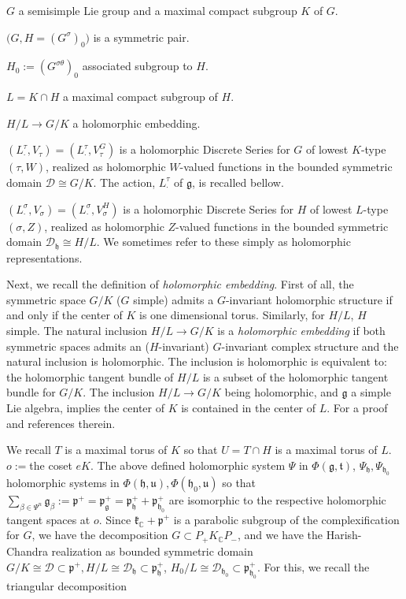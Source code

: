\documentclass[12pt]{amsart}
\theoremstyle{definition}
\theoremstyle{remark}
\newcommand{\g}{\mathfrak{g}}
\newcommand{\h}{\mathfrak{h}}
\renewcommand{\k}{{\mathfrak k}}
\newcommand{\p}{\mathfrak p}
\newcommand{\C}{{\mathbb C}}
\numberwithin{equation}{section}
\begin{document}
 $G$ a semisimple Lie group and a maximal compact subgroup $K$ of $G$.

 $\bigl(G,H=(G^\sigma)_0\bigr)$ is a symmetric pair.

 $H_0:=(G^{\sigma \theta})_0$ associated subgroup to $H$.

 $L=K\cap H$  a maximal compact subgroup of $H$.

 $H/L \rightarrow G/K$   a holomorphic embedding.

 $(L_\cdot^\tau ,V_\tau)=(L_\cdot^\tau ,V_\tau^G)$ is a holomorphic Discrete Series for $G$ of lowest $K$-type $(\tau,W)$, realized as holomorphic $W$-valued functions in the bounded symmetric domain $\mathcal D\cong G/K$.      The action, $L_\cdot^\tau $ of $\mathfrak g$,  is recalled bellow.



 $(L_\cdot^\sigma ,V_\sigma)=(L_\cdot^\sigma ,V_\sigma^H )$ is a holomorphic Discrete Series for $H$ of lowest $L$-type $(\sigma, Z)$, realized as holomorphic $Z$-valued functions in the bounded symmetric domain $\mathcal D_\mathfrak h \cong H/L$. We sometimes refer to these simply as holomorphic representations.

Next, we recall the definition of {\it holomorphic embedding}. First of all, the symmetric space $G/K$ ($G$ simple) admits a $G$-invariant holomorphic structure if and only if the center of $K$ is one dimensional torus.
Similarly, for $H/L$, $H$ simple. The natural inclusion $H/L\rightarrow G/K$ is a {\it holomorphic embedding} if both symmetric spaces admits an ($H$-invariant) $G$-invariant complex structure and
the natural inclusion is holomorphic. The inclusion is holomorphic is equivalent to: the holomorphic tangent bundle of $H/L$ is a subset of the holomorphic tangent bundle for $G/K$. The   inclusion $H/L\rightarrow G/K$ being holomorphic, and $\g$ a simple Lie algebra, implies the center of $K$ is contained in the center of $L$. For a proof \cite[Table 2.1.3]{Kob9} and references therein.


We recall   $ T$ is a maximal torus of $K$ so that $U=T\cap H$ is a maximal torus of $L$.  $o :=$the coset $eK$. The above defined holomorphic system  $\Psi$   in $\Phi(\mathfrak g,\mathfrak t)$, $\Psi_\h, \Psi_{\h_0}$ holomorphic systems in $\Phi(\mathfrak h,\mathfrak u), \Phi(\mathfrak h_0,\mathfrak u)$   so that
 $\sum_{\beta \in \Psi^n} \mathfrak g_\beta:=\mathfrak p^+=\mathfrak p_\mathfrak g^+= \mathfrak p_{\mathfrak h}^+ + \mathfrak p_{\mathfrak h_0}^+$ are isomorphic to the respective   holomorphic tangent spaces at $o$. Since $\k_\C +\p^+$ is a parabolic subgroup of the complexification for $G$, we have the decomposition $G\subset P_+K_\mathbb C P_{-}$, and we have the Harish-Chandra realization as bounded symmetric domain  $G/K \cong \mathcal D\subset \mathfrak p^+, H/L \cong \mathcal D_\mathfrak h \subset \mathfrak p_\mathfrak h^+$, $ H_0/L \cong \mathcal D_{\mathfrak h_0} \subset \mathfrak p_{\mathfrak h_0}^+$. For this, we recall the triangular  decomposition
\end{document}
